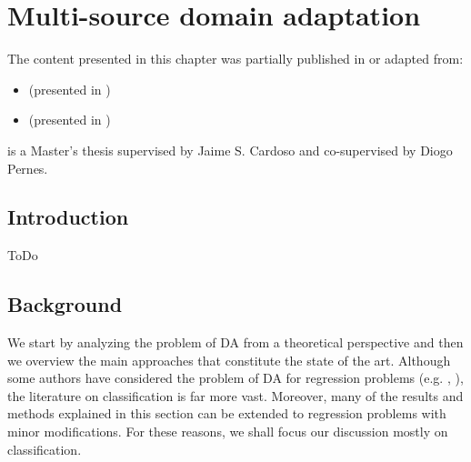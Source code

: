 
\chapter{Multi-source domain adaptation}


\label{chp:domain_adaptation}


\begin{tcolorbox}
	\small{
		The content presented in this chapter was partially published in or adapted from:
		\begin{itemize}
			\item[] \cite{ThesisFrancisco}  (presented in )
			\item[] \cite{MODAFM}  (presented in )
		\end{itemize}
		
		\cite{ThesisFrancisco} is a Master's thesis supervised by Jaime S. Cardoso and co-supervised by Diogo Pernes.
	}
\end{tcolorbox}

\section{Introduction}
\label{sec:chp3_intro}
ToDo

\section{Background}
\label{sec:chp3_background}
We start by analyzing the problem of DA from a theoretical perspective and then we overview the main approaches that constitute the state of the art. Although some authors have considered the problem of DA for regression problems (e.g. \cite{Cortes2011}, \cite{Zhao2018}), the literature on classification is far more vast. Moreover, many of the results and methods explained in this section can be extended to regression problems with minor modifications. For these reasons, we shall focus our discussion mostly on classification.

